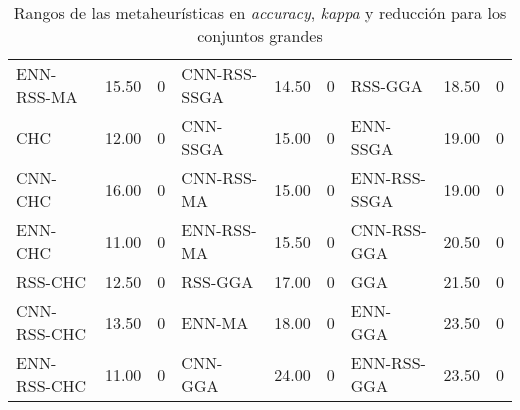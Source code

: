 \begin{table}[]
\begin{adjustbox}{max width =\textwidth}
\begin{tabular}{l c c|l c c|l c c}
ENN-RSS-MA   & 15.50 & 0 & CNN-RSS-SSGA & 14.50 & 0 & RSS-GGA      & 18.50 & 0 \\
CHC          & 12.00 & 0 & CNN-SSGA     & 15.00 & 0 & ENN-SSGA     & 19.00 & 0 \\
CNN-CHC      & 16.00 & 0 & CNN-RSS-MA   & 15.00 & 0 & ENN-RSS-SSGA & 19.00 & 0 \\
ENN-CHC      & 11.00 & 0 & ENN-RSS-MA   & 15.50 & 0 & CNN-RSS-GGA  & 20.50 & 0 \\
RSS-CHC      & 12.50 & 0 & RSS-GGA      & 17.00 & 0 & GGA          & 21.50 & 0 \\
CNN-RSS-CHC  & 13.50 & 0 & ENN-MA       & 18.00 & 0 & ENN-GGA      & 23.50 & 0 \\
ENN-RSS-CHC  & 11.00 & 0 & CNN-GGA      & 24.00 & 0 & ENN-RSS-GGA  & 23.50 & 0 \\


\hline
\end{tabular}
\end{adjustbox}
\caption{Rangos de las metaheurísticas en \emph{accuracy}, \emph{kappa} y reducción para los conjuntos grandes}
\label{table-inits-rank}
\end{table} 


